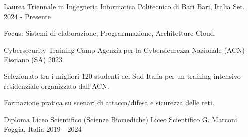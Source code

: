 
\vspace{0.3cm}

\begin{cventries}

  \cventry
    {Laurea Triennale in Ingegneria Informatica} 
    {Politecnico di Bari} 
    {Bari, Italia} 
    {Set. 2024 - Presente} 
    {
      \begin{cvitems}
        \item {Focus: Sistemi di elaborazione, Programmazione, Architetture Cloud.}
      \end{cvitems}
    }

  \vspace{0.8cm}

  \cventry
    {Cybersecurity Training Camp} 
    {Agenzia per la Cybersicurezza Nazionale (ACN)} 
    {Fisciano (SA)} 
    {2023} 
    {
      \begin{cvitems}
        \item {Selezionato tra i migliori 120 studenti del Sud Italia per un training intensivo residenziale organizzato dall'ACN.}
        \item {Formazione pratica su scenari di attacco/difesa e sicurezza delle reti.}
      \end{cvitems}
    }

  \vspace{0.8cm}

  \cventry
    {Diploma Liceo Scientifico (Scienze Biomediche)} 
    {Liceo Scientifico G. Marconi} 
    {Foggia, Italia} 
    {2019 - 2024} 
    {
    }

\end{cventries}